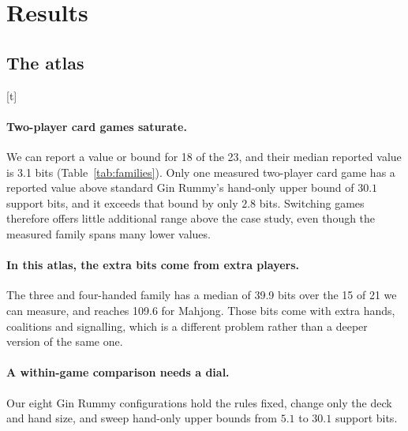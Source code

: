 \documentclass{article}
\makeatletter
\renewenvironment{table}
{\setlength{\abovecaptionskip}{10\p@}%
   \setlength{\belowcaptionskip}{\z@}%
\@float{table}} {\end@float}
\makeatother
\begin{document}
\FloatBarrier
\section{Results}
\label{sec:results}

\subsection{The atlas}
\label{sec:r-atlas}

\begin{table}[t]
  \centering \small
  
  \caption{The atlas by family. \emph{Measured} counts games with any reported exact value or bound. Medians and ranges summarise those reported entries and inherit their provenance. The board family's six measured games are exactly its perfect-information controls, so every fog-of-war game is unmeasured.}
  \label{tab:families}
\end{table}

\paragraph{Two-player card games saturate.} We can report a value or bound for 18 of the 23, and their median reported value is 3.1 bits (Table~\ref{tab:families}). Only one measured two-player card game has a reported value above standard Gin Rummy's hand-only upper bound of $30.1$ support bits, and it exceeds that bound by only $2.8$ bits. Switching games therefore offers little additional range above the case study, even though the measured family spans many lower values.

\paragraph{In this atlas, the extra bits come from extra players.} The three and four-handed family has a median of 39.9 bits over the 15 of 21 we can measure, and reaches 109.6 for Mahjong. Those bits come with extra hands, coalitions and signalling, which is a different problem rather than a deeper version of the same one.

\paragraph{A within-game comparison needs a dial.} Our eight Gin Rummy configurations hold the rules fixed, change only the deck and hand size, and sweep hand-only upper bounds from $5.1$ to $30.1$ support bits.
\end{document}
